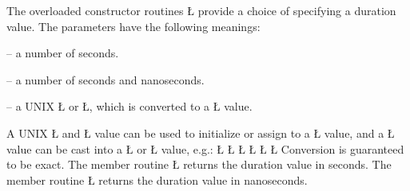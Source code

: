 \documentclass[openright,twoside]{report}
\begin{document}
The overloaded constructor routines \LGinlinetrue\LGbegin\lgrinde\L{}\endlgrinde\LGend{} provide a choice of specifying a duration value.
The parameters have the following meanings:
\begin{prefix}
\item[\LGinlinetrue\LGbegin\lgrinde\L{\LB{\V{sec}}}\endlgrinde\LGend{}] -- a number of seconds.
\item[\LGinlinetrue\LGbegin\lgrinde\L{\LB{\V{nsec}}}\endlgrinde\LGend{}] -- a number of seconds and nanoseconds.
\item[\LGinlinetrue\LGbegin\lgrinde\L{\LB{\V{timeval}}}\endlgrinde\LGend{} / \LGinlinetrue\LGbegin\lgrinde\L{\LB{\V{timespec}}}\endlgrinde\LGend{}] -- a UNIX \LGinlinetrue\LGbegin\lgrinde\L{}\endlgrinde\LGend{} or \LGinlinetrue\LGbegin\lgrinde\L{}\endlgrinde\LGend{}, which is converted to a \LGinlinetrue\LGbegin\lgrinde\L{}\endlgrinde\LGend{} value.
\end{prefix}

A UNIX \LGinlinetrue\LGbegin\lgrinde\L{}\endlgrinde\LGend{} and \LGinlinetrue\LGbegin\lgrinde\L{}\endlgrinde\LGend{} value can be used to initialize or assign to a \LGinlinetrue\LGbegin\lgrinde\L{}\endlgrinde\LGend{} value, and a \LGinlinetrue\LGbegin\lgrinde\L{}\endlgrinde\LGend{} value can be cast into a \LGinlinetrue\LGbegin\lgrinde\L{}\endlgrinde\LGend{} or \LGinlinetrue\LGbegin\lgrinde\L{}\endlgrinde\LGend{} value, e.g.:
\LGinlinefalse\LGbegin\lgrinde
\L{}
\CE{}\L{}
\CE{}\L{}
\CE{}\L{}
\CE{}\L{}
\CE{}\L{}
\CE{}\endlgrinde\LGend
Conversion is guaranteed to be exact.
The member routine \LGinlinetrue\LGbegin\lgrinde\L{}\endlgrinde\LGend{} returns the duration value in seconds.
The member routine \LGinlinetrue\LGbegin\lgrinde\L{}\endlgrinde\LGend{} returns the duration value in nanoseconds.
\end{document}
